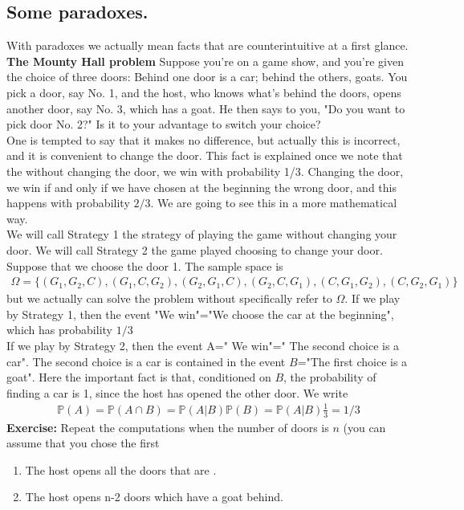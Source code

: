 \documentclass[12pt]{article}
\newcommand{\<}{{\langle \!\! \langle}}
\renewcommand{\>}{{\rangle \!\! \rangle}}
\newcommand{\bel}[2]{\begin{equation} \label{#1} \begin{split} #2
 					\end{split} \end{equation}}
\begin{document}
\subsection{Some paradoxes.}
With paradoxes we actually mean facts that are counterintuitive at a first glance.\\ 
\textbf{The Mounty Hall problem}
Suppose you're on a game show, and you're given the choice of three doors: Behind one door is a car; behind the others, goats. You pick a door, say No. 1, and the host, who knows what's behind the doors, opens another door, say No. 3, which has a goat. He then says to you, "Do you want to pick door No. 2?" Is it to your advantage to switch your choice? \\
One is tempted to say that it makes no difference, but actually this is incorrect, and it is convenient to change the door. This fact is explained once we note that the without changing the door, we win with probability 1/3. Changing the door, we win if and only if we have chosen at the beginning the wrong door, and this happens with probability $2/3$. We are going to see this in a more mathematical way. \\
We will call Strategy 1 the strategy of playing the game without changing your door. We will call Strategy 2 the game played choosing to change your door. \\
Suppose that we choose the door 1. The sample space is \bel{}{\Omega=\{(G_1,G_2,C),(G_1,C,G_2),(G_2,G_1,C),(G_2,C,G_1),(C,G_1,G_2),(C, G_2,G_1)\}}
but we actually can solve the problem without specifically refer to $\Omega$.
If we play by Strategy 1, then the event "We win"="We choose the car at the beginning", which has probability $1/3$\\
If we play by Strategy 2, then the event A=" We win"=" The second choice is a car". The second choice is a car is contained in the event $B$="The first choice is a goat". Here the important fact is that, conditioned on $B$, the probability of finding a car is 1, since the host has opened the other door. We write 
\bel{}{\mathbb{P}(A)=\mathbb{P}(A\cap B)=\mathbb{P}(A|B)\mathbb{P}(B)=\mathbb{P}(A|B) \frac{1}{3}=1/3}
\textbf{Exercise:} Repeat the computations when the number of doors is $n$ (you can assume that you chose the first
\begin{enumerate}
    \item The host opens all the doors that are .\\
    
    \item The host opens n-2 doors which have a goat behind.
\end{enumerate}
\end{document}
